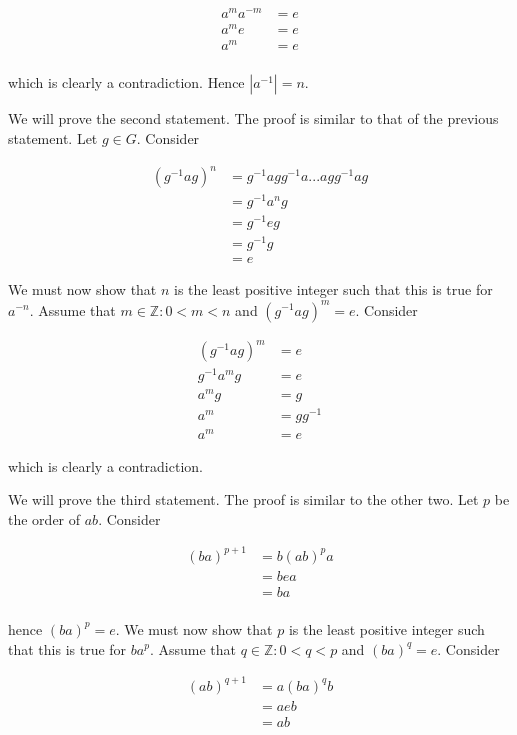 \documentclass[a4paper]{article}
\begin{document}
\begin{align*}
a^m a^{-m} &= e \\
a^m e &= e \\
a^m &= e \\
\end{align*}

which is clearly a contradiction. Hence $|a^{-1}| = n$.

\vspace{\baselineskip}

We will prove the second statement. The proof is similar to that of the previous statement. Let $g \in G$. Consider 

\begin{align*}
(g^{-1} a g)^n &= g^{-1} a g g^{-1} a ... a g g^{-1} a g \\
&= g^{-1} a^n g \\
&= g^{-1} e g \\
&= g^{-1} g \\
&= e
\end{align*} 

We must now show that $n$ is the least positive integer such that this is true for $a^{-n}$. Assume that $m \in \mathbb{Z} : 0 < m < n$ and  $(g^{-1} a g)^{m} = e$. Consider

\begin{align*}
(g^{-1} a g)^{m} &= e \\
g^{-1} a^m g &= e \\
a^m g &= g \\ 
a^m &= gg^{-1} \\ 
a^m &= e
\end{align*}

which is clearly a contradiction.

\vspace{\baselineskip}

We will prove the third statement. The proof is similar to the other two. Let $p$ be the order of $ab$. Consider

\begin{align*}
(ba)^{p+1} &= b (ab)^p a \\
&= b e a \\
&= ba \\
\end{align*}

hence $(ba)^p = e$. We must now show that $p$ is the least positive integer such that this is true for $ba^{p}$. Assume that $q \in \mathbb{Z} : 0 < q < p$ and  $(ba)^{q} = e$. Consider

\begin{align*}
(ab)^{q+1} &= a (ba)^q b \\
&= a e b \\
&= ab
\end{align*}
\end{document}
